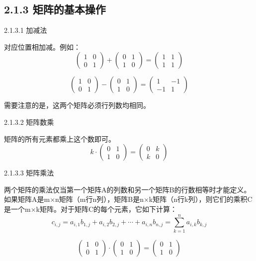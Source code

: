 \subsection{2.1.3 矩阵的基本操作}

2.1.3.1 加减法

对应位置相加减。例如：
$$\begin{pmatrix}1&0\\0&1\end{pmatrix}+\begin{pmatrix}0&1\\1&0\end{pmatrix}=\begin{pmatrix}1&1\\1&1\end{pmatrix}$$

$$\begin{pmatrix}1&0\\0&1\end{pmatrix}-\begin{pmatrix}0&1\\1&0\end{pmatrix}=\begin{pmatrix}1&-1\\-1&1\end{pmatrix}$$

需要注意的是，这两个矩阵必须行列数均相同。

2.1.3.2 矩阵数乘

矩阵的所有元素都乘上这个数即可。
$$k\cdot\begin{pmatrix}0&1\\1&0\end{pmatrix}=\begin{pmatrix}0&k\\k&0\end{pmatrix}$$

2.1.3.3 矩阵乘法

两个矩阵的乘法仅当第一个矩阵A的列数和另一个矩阵B的行数相等时才能定义。如果矩阵A是m×n矩阵（m行n列），矩阵B是n×k矩阵（n行k列），则它们的乘积C是一个m×k矩阵。对于矩阵C的每个元素，它如下计算：
$$c_{i,j}=a_{i,1} b_{1,j}+a_{i,2} b_{2,j}+\cdots+a_{i,n} b_{n,j}=\sum_{k=1}^n a_{i,k} b_{k,j}$$

$$\begin{pmatrix}1&0\\0&1\end{pmatrix}\cdot\begin{pmatrix}0&1\\1&0\end{pmatrix}=\begin{pmatrix}0&1\\1&0\end{pmatrix}$$


